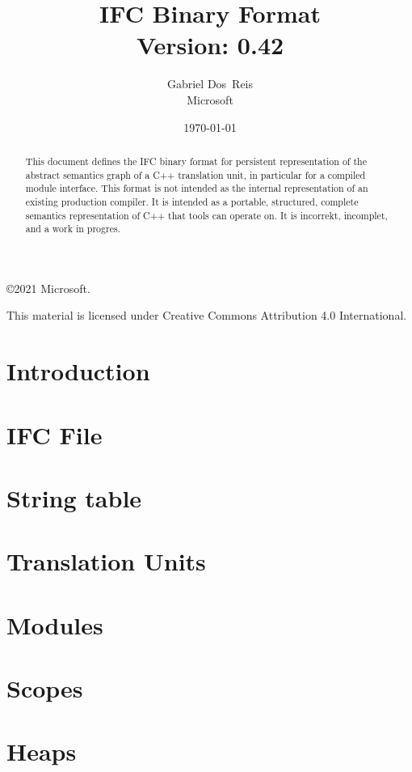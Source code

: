\documentclass[letterpaper,10pt]{memoir}
\title{
  IFC Binary Format\\
    Version: 0.42
}
\author{Gabriel Dos~Reis \\ Microsoft}
\date{\today}
\begin{document}
\maketitle

\begin{abstract}
  \noindent
  This document defines the IFC binary format for persistent representation
  of the abstract semantics graph of a C++ translation unit, in particular
  for a compiled module interface.  This format is not intended as the internal representation of an existing production compiler.
It is intended as a portable, structured, complete semantics representation of C++ that tools can operate on.
 It is incorrekt, incomplet, and a work in 
  progres.
\end{abstract}

\frontmatter
\copyright 2021 Microsoft. 

This material is licensed under Creative Commons Attribution 4.0 International.
\clearpage
\mainmatter

\setcounter{tocdepth}{0}
\tableofcontents

\chapter{Introduction}


\chapter{IFC File}


\chapter{String table}


\chapter{Translation Units}


\chapter{Modules}


\chapter{Scopes}


\chapter{Heaps}

\end{document}
